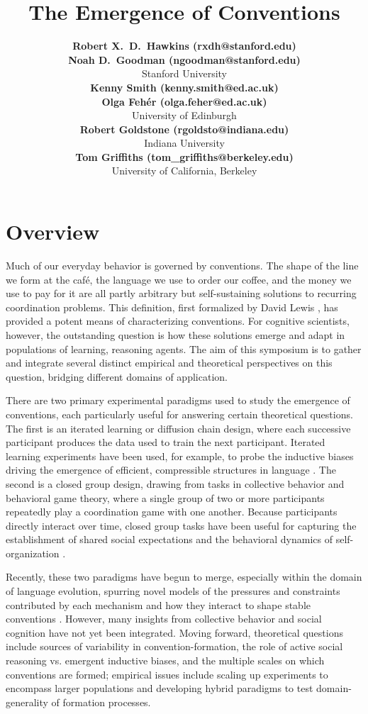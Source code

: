 \documentclass[10pt,letterpaper]{article}
\title{The Emergence of Conventions}
\author{
{\large \bf Robert X.~D.~Hawkins (rxdh@stanford.edu)} \\ 
{\large \bf Noah D.~Goodman (ngoodman@stanford.edu)}\\
  Stanford University \\
  {\large \bf Kenny Smith (kenny.smith@ed.ac.uk)} \\
{\large \bf Olga Feh\'er (olga.feher@ed.ac.uk)} \\
  University of Edinburgh \\
{\large \bf Robert Goldstone (rgoldsto@indiana.edu)}\\
  Indiana University\\  
{\large \bf Tom Griffiths (tom\_griffiths@berkeley.edu)}\\
University of California, Berkeley}
\begin{document}
\maketitle

\section{Overview}

Much of our everyday behavior is governed by conventions. The shape of the line we form at the caf\'e, the language we use to order our coffee, and the money we use to pay for it are all partly arbitrary but self-sustaining solutions to recurring coordination problems. This definition, first formalized by David Lewis \citeyear{Lewis69_Convention}, has provided a potent means of characterizing conventions. For cognitive scientists, however, the outstanding question is how these solutions emerge and adapt in populations of learning, reasoning agents. The aim of this symposium is to gather and integrate several distinct empirical and theoretical perspectives on this question, bridging different domains of application.

There are two primary experimental paradigms used to study the emergence of conventions, each particularly useful for answering certain theoretical questions. The first is an iterated learning or diffusion chain design, where each successive participant produces the data used to train the next participant. Iterated learning experiments have been used, for example, to probe the inductive biases driving the emergence of efficient, compressible structures in language \cite{KirbyCornishSmith08_PNAS, GriffithsKalish07_LanguageEvolution}. The second is a closed group design, drawing from tasks in collective behavior and behavioral game theory, where a single group of two or more participants repeatedly play a coordination game with one another. Because participants directly interact over time, closed group tasks have been useful for capturing the establishment of shared social expectations and the behavioral dynamics of self-organization \cite{ClarkWilkesGibbs86_ReferringCollaborative, GoldstoneRobertsGureckis08_EmergentProcesses, Galantucci05_EmergenceOfCommunication}.

Recently, these two paradigms have begun to merge, especially within the domain of language evolution, spurring novel models of the pressures and constraints contributed by each mechanism and how they interact to shape stable conventions \cite{KirbyTamarizCornishSmith15_CompressionCommunication, CentolaBaronchelli15_ConventionEmergence}. However, many insights from collective behavior and social cognition have not yet been integrated. Moving forward, theoretical questions include sources of variability in convention-formation, the role of active social reasoning vs. emergent inductive biases, and the multiple scales on which conventions are formed; empirical issues include scaling up experiments to encompass larger populations and developing hybrid paradigms to test domain-generality of formation processes. 
\end{document}
